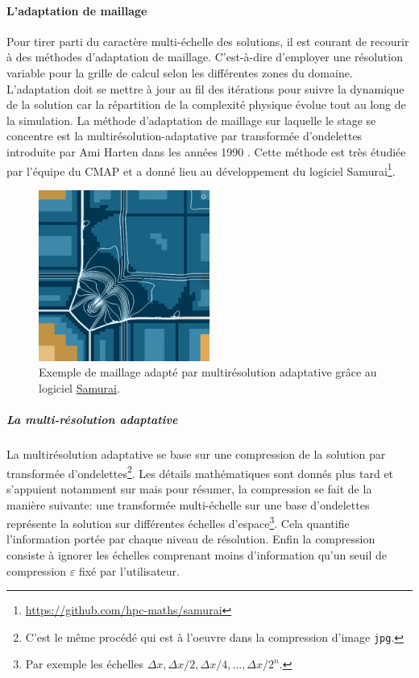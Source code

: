     \paragraph{L'adaptation de maillage}
    Pour tirer parti du caractère multi-échelle des solutions, il est courant de recourir à des méthodes d'adaptation de maillage.
    C'est-à-dire d'employer une résolution variable pour la grille de calcul selon les différentes zones du domaine. 
    L'adaptation doit se mettre à jour au fil des itérations pour suivre la dynamique de la solution car la répartition de la complexité physique évolue tout au long de la simulation.
    La méthode d'adaptation de maillage sur laquelle le stage se concentre est la multirésolution-adaptative par transformée d'ondelettes introduite par Ami Harten dans les années 1990 \cite{harten1994}.
    Cette méthode est très étudiée par l'équipe du CMAP et a donné lieu au développement du logiciel Samurai\footnote{\href{https://github.com/hpc-maths/samurai}{https://github.com/hpc-maths/samurai}}.
    \begin{figure}[h]
    \centering
    \includegraphics[width=0.5\textwidth]{media/3_/3_/exemple_compression_samurai.png}
    \caption{Exemple de maillage adapté par multirésolution adaptative grâce au logiciel \href{https://github.com/hpc-maths/samurai}{Samurai}.}
    \label{fig:samurai}
    \end{figure}

        \subparagraph{La multi-résolution adaptative}
        La multirésolution adaptative se base sur une compression de la solution par transformée d'ondelettes\footnote{C'est le même procédé qui est à l'oeuvre dans la compression d'image \texttt{jpg}.}.
        Les détails mathématiques sont donnés plus tard et s'appuient notamment sur \cite{postePoly} mais pour résumer, la compression se fait de la manière suivante:
        une transformée multi-échelle sur une base d'ondelettes représente la solution sur différentes échelles d'espace\footnote{Par exemple les échelles $\Delta x, \Delta x/2,\Delta x/4,\dots, \Delta x/2^n$.}. 
        Cela quantifie l'information portée par chaque niveau de résolution. Enfin la compression consiste à ignorer les échelles comprenant moins d'information
        qu'un seuil de compression $\varepsilon$ fixé par l'utilisateur.

